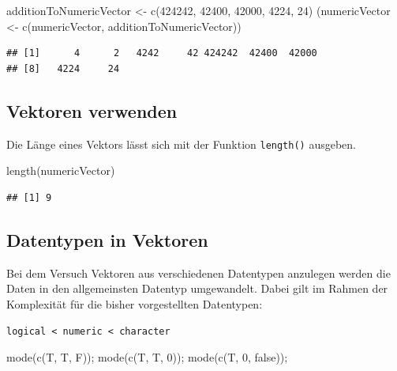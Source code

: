 \documentclass[
]{book}
\newenvironment{Shaded}{\begin{snugshade}}{\end{snugshade}}
\newcommand{\DecValTok}[1]{\textcolor[rgb]{0.00,0.00,0.81}{#1}}
\newcommand{\FunctionTok}[1]{\textcolor[rgb]{0.00,0.00,0.00}{#1}}
\newcommand{\NormalTok}[1]{#1}
\newcommand{\OtherTok}[1]{\textcolor[rgb]{0.56,0.35,0.01}{#1}}
\newcommand{\StringTok}[1]{\textcolor[rgb]{0.31,0.60,0.02}{#1}}
\begin{document}
\begin{Shaded}
\begin{Highlighting}[]
\NormalTok{additionToNumericVector }\OtherTok{\textless{}{-}}  \FunctionTok{c}\NormalTok{(}\DecValTok{424242}\NormalTok{, }\DecValTok{42400}\NormalTok{, }\DecValTok{42000}\NormalTok{,}
                               \DecValTok{4224}\NormalTok{, }\DecValTok{24}\NormalTok{)}
\NormalTok{(numericVector }\OtherTok{\textless{}{-}} \FunctionTok{c}\NormalTok{(numericVector, }
\NormalTok{                    additionToNumericVector))}
\end{Highlighting}
\end{Shaded}

\begin{verbatim}
## [1]      4      2   4242     42 424242  42400  42000
## [8]   4224     24
\end{verbatim}

\hypertarget{vektoren-verwenden}{%
\subsection{Vektoren verwenden}\label{vektoren-verwenden}}

Die Länge eines Vektors lässt sich mit der Funktion \texttt{length()} ausgeben.

\begin{Shaded}
\begin{Highlighting}[]
\FunctionTok{length}\NormalTok{(numericVector)}
\end{Highlighting}
\end{Shaded}

\begin{verbatim}
## [1] 9
\end{verbatim}

\hypertarget{datentypen-in-vektoren}{%
\subsection{Datentypen in Vektoren}\label{datentypen-in-vektoren}}

Bei dem Versuch Vektoren aus verschiedenen Datentypen anzulegen werden die Daten in den allgemeinsten Datentyp umgewandelt. Dabei gilt im Rahmen der Komplexität für die bisher vorgestellten Datentypen:

\texttt{logical\ \textless{}\ numeric\ \textless{}\ character}

\begin{Shaded}
\begin{Highlighting}[]
\FunctionTok{mode}\NormalTok{(}\FunctionTok{c}\NormalTok{(T, T, F));}
\FunctionTok{mode}\NormalTok{(}\FunctionTok{c}\NormalTok{(T, T, }\DecValTok{0}\NormalTok{));}
\FunctionTok{mode}\NormalTok{(}\FunctionTok{c}\NormalTok{(T, }\DecValTok{0}\NormalTok{, }\StringTok{\textquotesingle{}false\textquotesingle{}}\NormalTok{));}
\end{Highlighting}
\end{Shaded}
\end{document}
